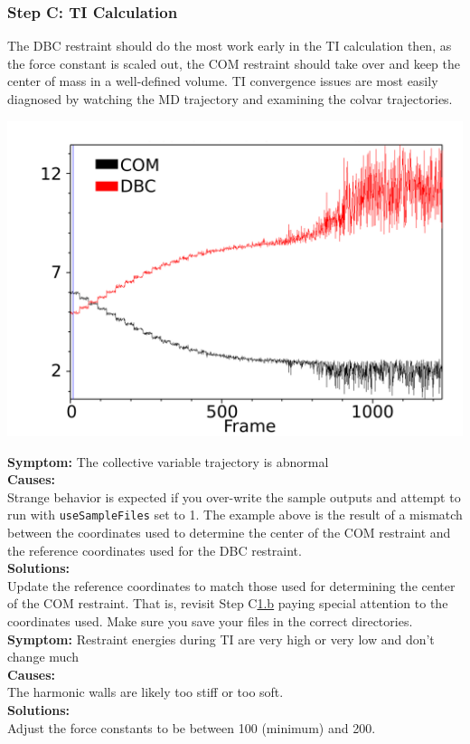 \documentclass[9pt,tutorial]{Styling/livecoms}
\newcommand{\textInput}[1]{
  \texttt{#1}
}
\begin{document}
\subsubsection{Step C: TI Calculation}
The DBC restraint should do the most work early in the TI calculation then, as the force constant is scaled out, the COM restraint should take over and keep the center of mass in a well-defined volume. TI convergence issues are most easily diagnosed by watching the MD trajectory and examining the colvar trajectories.

\includegraphics[width=0.9\linewidth]{CV_COM_mismatchedRefs.png}

\noindent\textbf{Symptom:} The collective variable trajectory is abnormal\\
\textbf{Causes:}\\
Strange behavior is expected if you over-write the sample outputs and attempt to run with \textInput{useSampleFiles} set to 1. The example above is the result of a mismatch between the coordinates used to determine the center of the COM restraint and the reference coordinates used for the DBC restraint.\\
\textbf{Solutions:}\\
Update the reference coordinates to match those used for determining the center of the COM restraint. That is, revisit Step C\hyperref[step:defineGasRestraints]{1.b} paying special attention to the coordinates used. Make sure you save your files in the correct directories. \\

\noindent\textbf{Symptom:} Restraint energies during TI are very high or very low and don't change much\\
\textbf{Causes:}\\
The harmonic walls are likely too stiff or too soft.\\
\textbf{Solutions:}\\
Adjust the force constants to be between 100 (minimum) and 200. \\
\end{document}
